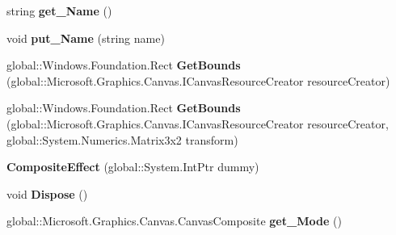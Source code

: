 \begin{DoxyCompactItemize}
\item 
\mbox{\label{class_microsoft_1_1_graphics_1_1_canvas_1_1_effects_1_1_composite_effect_a63d03ebf847fd4f46315ca9f1773c46d}} 
string {\bfseries get\+\_\+\+Name} ()
\item 
\mbox{\label{class_microsoft_1_1_graphics_1_1_canvas_1_1_effects_1_1_composite_effect_abd53f3406b6ae816b17d0aeee7119e44}} 
void {\bfseries put\+\_\+\+Name} (string name)
\item 
\mbox{\label{class_microsoft_1_1_graphics_1_1_canvas_1_1_effects_1_1_composite_effect_a991680e8a31e88420dd24001b74e229e}} 
global\+::\+Windows.\+Foundation.\+Rect {\bfseries Get\+Bounds} (global\+::\+Microsoft.\+Graphics.\+Canvas.\+I\+Canvas\+Resource\+Creator resource\+Creator)
\item 
\mbox{\label{class_microsoft_1_1_graphics_1_1_canvas_1_1_effects_1_1_composite_effect_a403028b263af314b1162888a2320783e}} 
global\+::\+Windows.\+Foundation.\+Rect {\bfseries Get\+Bounds} (global\+::\+Microsoft.\+Graphics.\+Canvas.\+I\+Canvas\+Resource\+Creator resource\+Creator, global\+::\+System.\+Numerics.\+Matrix3x2 transform)
\item 
\mbox{\label{class_microsoft_1_1_graphics_1_1_canvas_1_1_effects_1_1_composite_effect_a32c62338e5b874000e491bacc0e032c1}} 
{\bfseries Composite\+Effect} (global\+::\+System.\+Int\+Ptr dummy)
\item 
\mbox{\label{class_microsoft_1_1_graphics_1_1_canvas_1_1_effects_1_1_composite_effect_a575ed0bb91f8f9057d8c3afe03a121e5}} 
void {\bfseries Dispose} ()
\item 
\mbox{\label{class_microsoft_1_1_graphics_1_1_canvas_1_1_effects_1_1_composite_effect_a0dfe9fcf616917956fcad2cd37bb9866}} 
global\+::\+Microsoft.\+Graphics.\+Canvas.\+Canvas\+Composite {\bfseries get\+\_\+\+Mode} ()

\end{DoxyCompactItemize}
